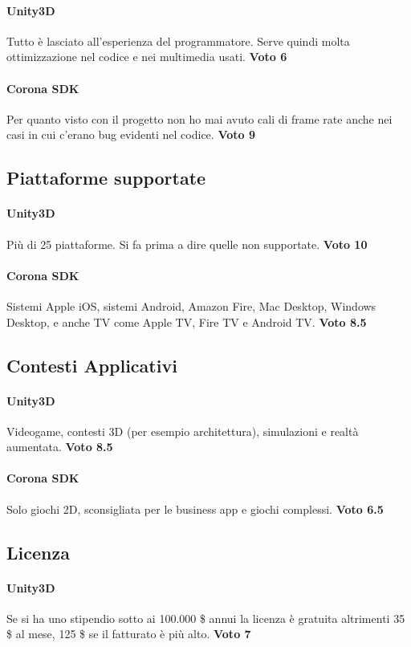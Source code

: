 		\paragraph{Unity3D} Tutto è lasciato all'esperienza del programmatore. Serve quindi molta ottimizzazione nel codice e nei multimedia usati. \textbf{Voto 6}
		\paragraph{Corona SDK} Per quanto visto con il progetto non ho mai avuto cali di frame rate anche nei casi in cui c'erano bug evidenti nel codice. \textbf{Voto 9}
	
	\subsection*{Piattaforme supportate}
		\paragraph{Unity3D} Più di 25 piattaforme. Si fa prima a dire quelle non supportate. \textbf{Voto 10}
		\paragraph{Corona SDK} Sistemi Apple iOS, sistemi Android, Amazon Fire, Mac Desktop, Windows Desktop, e anche TV come Apple TV, Fire TV e Android TV. \textbf{Voto 8.5}
	
	\subsection*{Contesti Applicativi}
		\paragraph{Unity3D} Videogame, contesti 3D (per esempio architettura), simulazioni e realtà aumentata. \textbf{Voto 8.5}
		\paragraph{Corona SDK} Solo giochi 2D, sconsigliata per le business app e giochi complessi. \textbf{Voto 6.5}
	
	\subsection*{Licenza}
		\paragraph{Unity3D} Se si ha uno stipendio sotto ai 100.000 \$ annui la licenza è gratuita altrimenti 35 \$ al mese, 125 \$ se il fatturato è più alto. \textbf{Voto 7}
